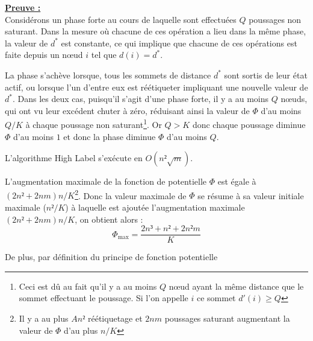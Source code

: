 \underline{\textbf{Preuve :}}\\
Considérons un phase forte au cours de laquelle sont effectuées $Q$ poussages non saturant.
Dans la mesure où chacune de ces opération a lieu dans la même phase, la valeur de $d^*$ est
constante, ce qui implique que chacune de ces opérations est faite depuis un n\oe ud $i$ tel que
$d(i) = d^*$.

La phase s'achève lorsque, tous les sommets de distance $d^*$ sont sortis de leur état actif, ou
lorsque l'un d'entre eux est réétiqueter impliquant une nouvelle valeur de $d^*$. Dans les deux cas,
puisqu'il s'agit d'une phase forte, il y a au moins $Q$ n\oe uds, qui ont vu leur excédent chuter à
zéro, réduisant ainsi la valeur de $\Phi$ d'au moins $Q/K$ à chaque poussage non
saturant\footnote{Ceci est dû au fait qu'il y a au moins $Q$ n\oe ud ayant la même distance que le
sommet effectuant le poussage. Si l'on appelle $i$ ce sommet $d'(i) \geq Q$}. Or $Q>K$
donc chaque poussage diminue $\Phi$ d'au moins $1$ et donc la phase diminue $\Phi$ d'au moins $Q$.

\begin{theorem}
	L'algorithme High Label s'exécute en $O(n²\sqrt{m})$.
\end{theorem}

L'augmentation maximale de la fonction de potentielle $\Phi$ est égale à $(2n²+2nm)n/K$\footnote{Il
	y a au plus $An²$ réétiquetage et $2nm$ poussages saturant augmentant la valeur de $\Phi$ d'au
plus $n/K$}. Donc la valeur maximale de $\Phi$ se résume à sa valeur initiale maximale ($n²/K$) à
laquelle est ajoutée l'augmentation maximale $(2n²+2nm)n/K$, on obtient alors : $$
\Phi_{\max} = \frac{2n³ + n² + 2n²m}{K} $$

De plus, par définition du principe de fonction potentielle

